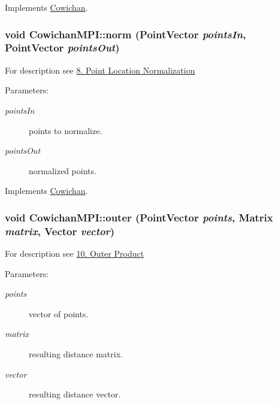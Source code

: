 Implements \hyperlink{class_cowichan_ec6cc4eb2ad444474b923532167e98a2}{Cowichan}.\hypertarget{class_cowichan_m_p_i_11df49e804427d4a0d085f4cff9302d0}{
\subsubsection[{norm}]{\setlength{\rightskip}{0pt plus 5cm}void CowichanMPI::norm ({\bf PointVector} {\em pointsIn}, \/  {\bf PointVector} {\em pointsOut})}}
\label{class_cowichan_m_p_i_11df49e804427d4a0d085f4cff9302d0}


For description see \hyperlink{index_norm_sec}{8. Point Location Normalization} \begin{Desc}
\item[Parameters:]
\begin{description}
\item[{\em pointsIn}]points to normalize. \item[{\em pointsOut}]normalized points. \end{description}
\end{Desc}


Implements \hyperlink{class_cowichan_3df21e3c627958114e045c3559a29f30}{Cowichan}.\hypertarget{class_cowichan_m_p_i_39fcc8a331b0e26438fbf43fa01cf7c1}{
\subsubsection[{outer}]{\setlength{\rightskip}{0pt plus 5cm}void CowichanMPI::outer ({\bf PointVector} {\em points}, \/  {\bf Matrix} {\em matrix}, \/  {\bf Vector} {\em vector})}}
\label{class_cowichan_m_p_i_39fcc8a331b0e26438fbf43fa01cf7c1}


For description see \hyperlink{index_outer_sec}{10. Outer Product} \begin{Desc}
\item[Parameters:]
\begin{description}
\item[{\em points}]vector of points. \item[{\em matrix}]resulting distance matrix. \item[{\em vector}]resulting distance vector. \end{description}
\end{Desc}


